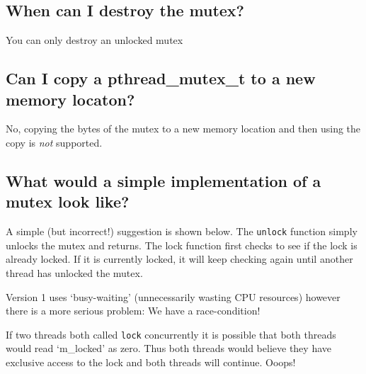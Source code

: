 \subsection{When can I destroy the
mutex?}\label{when-can-i-destroy-the-mutex}

You can only destroy an unlocked mutex

\subsection{Can I copy a pthread\_mutex\_t to a new memory
locaton?}\label{can-i-copy-a-pthreadux5fmutexux5ft-to-a-new-memory-locaton}

No, copying the bytes of the mutex to a new memory location and then
using the copy is \emph{not} supported.

\subsection{What would a simple implementation of a mutex look
like?}\label{what-would-a-simple-implementation-of-a-mutex-look-like}

A simple (but incorrect!) suggestion is shown below. The \texttt{unlock}
function simply unlocks the mutex and returns. The lock function first
checks to see if the lock is already locked. If it is currently locked,
it will keep checking again until another thread has unlocked the mutex.

\begin{Shaded}
\begin{Highlighting}[]

 
   \NormalTok{\}}

  \NormalTok{;}
\NormalTok{\}}
 
  \NormalTok{;}
\NormalTok{\}}
\end{Highlighting}
\end{Shaded}

Version 1 uses `busy-waiting' (unnecessarily wasting CPU resources)
however there is a more serious problem: We have a race-condition!

If two threads both called \texttt{lock} concurrently it is possible
that both threads would read `m\_locked' as zero. Thus both threads
would believe they have exclusive access to the lock and both threads
will continue. Ooops!

